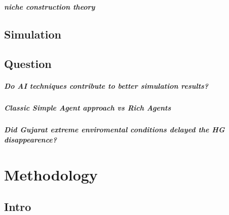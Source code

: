 \documentclass{report}
\begin{document}
			\paragraph{niche construction theory}
			
	\section{Simulation}
	
	\section{Question}
			\paragraph{Do AI techniques contribute to better simulation results?}
			\paragraph{Classic Simple Agent approach vs Rich Agents}
			\paragraph{Did Gujarat extreme enviromental conditions delayed the HG disappearence?}
			
\newpage 
\chapter{Methodology}
	\section{Intro}


\end{document}
